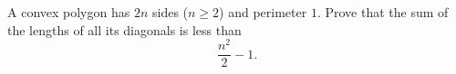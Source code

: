 A convex polygon has $2n$ sides ($n\ge2$) and perimeter $1$. Prove that the sum of the lengths of all its diagonals is less than
\[\dfrac{n^2}{2}-1.\]
